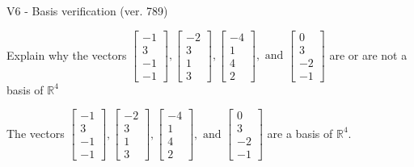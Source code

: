 \begin{exercise}
  \begin{exerciseTitle}V6 - Basis verification (ver. 789)\end{exerciseTitle}
  \begin{exerciseStatement}
    Explain why the vectors \(\left[\begin{array}{r}
-1 \\
3 \\
-1 \\
-1
\end{array}\right] , \left[\begin{array}{r}
-2 \\
3 \\
1 \\
3
\end{array}\right] , \left[\begin{array}{r}
-4 \\
1 \\
4 \\
2
\end{array}\right] , \text{ and } \left[\begin{array}{r}
0 \\
3 \\
-2 \\
-1
\end{array}\right]\) are or are not a basis of \(\mathbb{R}^4\)	


  \end{exerciseStatement}
  \begin{exerciseAnswer}
   The vectors \(\left[\begin{array}{r}
-1 \\
3 \\
-1 \\
-1
\end{array}\right] , \left[\begin{array}{r}
-2 \\
3 \\
1 \\
3
\end{array}\right] , \left[\begin{array}{r}
-4 \\
1 \\
4 \\
2
\end{array}\right] , \text{ and } \left[\begin{array}{r}
0 \\
3 \\
-2 \\
-1
\end{array}\right]\) 
  	 are  a basis of \(\mathbb{R}^4\).
  


  \end{exerciseAnswer}
\end{exercise}